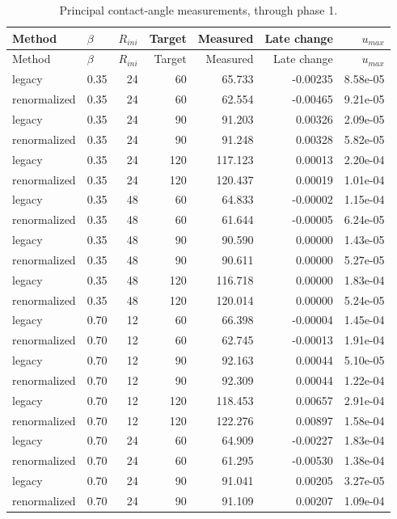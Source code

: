 \begin{longtable}{llrrrrr}
\caption{Principal contact-angle measurements, through phase 1.}\\
\toprule
Method & $\beta$ & $R_{ini}$ & Target & Measured & Late change & $u_{max}$ \\
\midrule\endfirsthead
\toprule Method & $\beta$ & $R_{ini}$ & Target & Measured & Late change & $u_{max}$ \\
\midrule\endhead
legacy & 0.35 & 24 & 60 & 65.733 & -0.00235 & 8.58e-05 \\
renormalized & 0.35 & 24 & 60 & 62.554 & -0.00465 & 9.21e-05 \\
legacy & 0.35 & 24 & 90 & 91.203 & 0.00326 & 2.09e-05 \\
renormalized & 0.35 & 24 & 90 & 91.248 & 0.00328 & 5.82e-05 \\
legacy & 0.35 & 24 & 120 & 117.123 & 0.00013 & 2.20e-04 \\
renormalized & 0.35 & 24 & 120 & 120.437 & 0.00019 & 1.01e-04 \\
legacy & 0.35 & 48 & 60 & 64.833 & -0.00002 & 1.15e-04 \\
renormalized & 0.35 & 48 & 60 & 61.644 & -0.00005 & 6.24e-05 \\
legacy & 0.35 & 48 & 90 & 90.590 & 0.00000 & 1.43e-05 \\
renormalized & 0.35 & 48 & 90 & 90.611 & 0.00000 & 5.27e-05 \\
legacy & 0.35 & 48 & 120 & 116.718 & 0.00000 & 1.83e-04 \\
renormalized & 0.35 & 48 & 120 & 120.014 & 0.00000 & 5.24e-05 \\
legacy & 0.70 & 12 & 60 & 66.398 & -0.00004 & 1.45e-04 \\
renormalized & 0.70 & 12 & 60 & 62.745 & -0.00013 & 1.91e-04 \\
legacy & 0.70 & 12 & 90 & 92.163 & 0.00044 & 5.10e-05 \\
renormalized & 0.70 & 12 & 90 & 92.309 & 0.00044 & 1.22e-04 \\
legacy & 0.70 & 12 & 120 & 118.453 & 0.00657 & 2.91e-04 \\
renormalized & 0.70 & 12 & 120 & 122.276 & 0.00897 & 1.58e-04 \\
legacy & 0.70 & 24 & 60 & 64.909 & -0.00227 & 1.83e-04 \\
renormalized & 0.70 & 24 & 60 & 61.295 & -0.00530 & 1.38e-04 \\
legacy & 0.70 & 24 & 90 & 91.041 & 0.00205 & 3.27e-05 \\
renormalized & 0.70 & 24 & 90 & 91.109 & 0.00207 & 1.09e-04 \\

\end{longtable}
